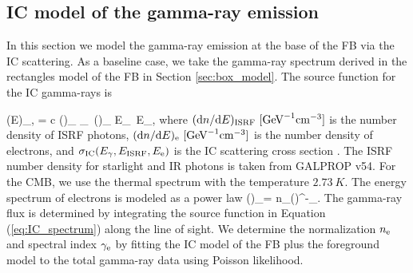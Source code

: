 \subsection{IC model of the gamma-ray emission}
\label{sec:IC_model}

In this section we model the gamma-ray emission at the base of the FB via the IC scattering.
As a baseline case, we take the gamma-ray spectrum derived in the rectangles model of the FB in Section \ref{sec:box_model}.
The source function for the IC gamma-rays is

\be
\label{eq:IC_spectrum}
\left(E\right)_{\!\!\gamma,\IC}\! = c\int\!\! \int \left(\right)_{\!\!\ISRF} \sigma_\IC\ \left(\right)_{\!\!\el} \de E_\ISRF\, \de E_\el,
\ee
where $(\text{d} n/ \text{d} E)_{\text{ISRF}}\ [\SI{}{GeV^{-1} cm^{-3}}]$ is the number density of ISRF photons,
$(\text{d} n / \text{d} E)_{\text{e}}\ [\SI{}{GeV^{-1} cm^{-3}}]$ is the number density of electrons, and $\sigma_{\text{IC}}(E_\gamma, E_{\text{ISRF}}, E_{\text{e}})$
is the IC scattering cross section \citep{1970RvMP...42..237B}.
The ISRF number density for starlight and IR photons is taken from GALPROP v54.
For the CMB, we use the thermal spectrum with the temperature $\SI{2.73}{K}$.
The energy spectrum of electrons is modeled as a power law 
\be 
\label{eq:e_spectrum}
\left(\right)_\el = n_\el \left(\right)^{-\gamma_\el}. %
\ee
The gamma-ray flux is determined by integrating the source function in Equation (\ref{eq:IC_spectrum}) along the line of sight.
We determine the normalization $n_{\text{e}}$ and spectral index $\gamma_{\text{e}}$  by fitting the IC model of the FB plus the foreground model to the 
total gamma-ray data using Poisson likelihood. 

